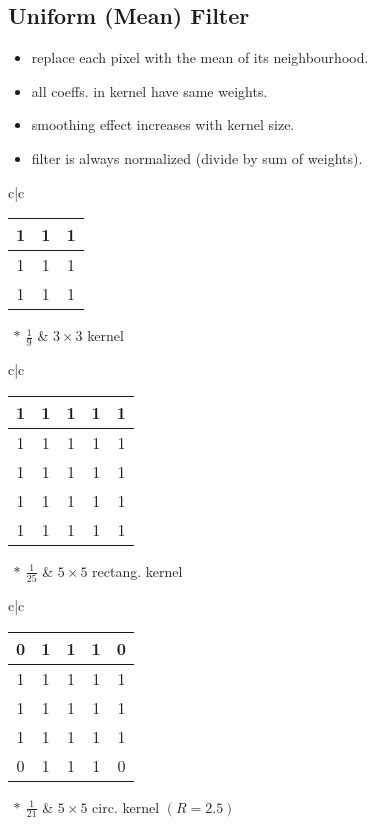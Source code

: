 \subsection{Uniform (Mean) Filter}
\begin{itemize}
  \item replace each pixel with the mean of its neighbourhood.
  \item all coeffs. in kernel have same weights.
  \item smoothing effect increases with kernel size.
  \item filter is always normalized (divide by sum of weights).
\end{itemize}
\begin{tabular}{c|c}
  \begin{tabular}{|c|c|c|}
  \hline
  1 & 1 & 1\\
  \hline
  1 & 1 & 1\\
  \hline
  1 & 1 & 1\\
  \hline
  \end{tabular}$\ *\ \frac{1}{9}$
  &  $3 \times 3$ kernel
\end{tabular}

\begin{tabular}{c|c}
  \begin{tabular}{|c|c|c|c|c|}
  \hline
  1 & 1 & 1 & 1 & 1\\
  \hline
  1 & 1 & 1 & 1 & 1\\
  \hline
  1 & 1 & 1 & 1 & 1\\
  \hline
  1 & 1 & 1 & 1 & 1\\
  \hline
  1 & 1 & 1 & 1 & 1\\
  \hline
  \end{tabular}$\ *\ \frac{1}{25}$
  &  $5 \times 5$ rectang. kernel
\end{tabular}

\begin{tabular}{c|c}
  \begin{tabular}{|c|c|c|c|c|}
  \hline
  0 & 1 & 1 & 1 & 0\\
  \hline
  1 & 1 & 1 & 1 & 1\\
  \hline
  1 & 1 & 1 & 1 & 1\\
  \hline
  1 & 1 & 1 & 1 & 1\\
  \hline
  0 & 1 & 1 & 1 & 0\\
  \hline
  \end{tabular}$\ *\ \frac{1}{21}$
  &  $5 \times 5$ circ. kernel $(R=2.5)$
\end{tabular}

